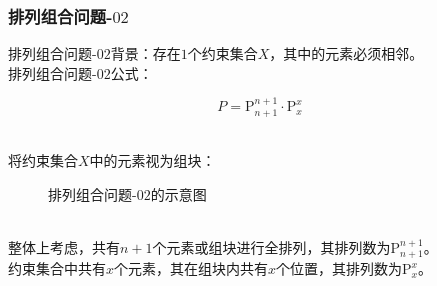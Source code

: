 \documentclass[UTF8]{ctexart}
\newcommand{\rnum}[1]{\uppercase\expandafter{\romannumeral #1\relax}}
\begin{document}
\newpage

\subsubsection{排列组合问题\rnum{1}-$02$}
    排列组合问题\rnum{1}-$02$背景：存在$1$个约束集合$X$，其中的元素必须相邻。\\[3mm]
    排列组合问题\rnum{1}-$02$公式：
    \begin{large}
        \begin{equation*}
           P=\mathrm{P}_{n+1}^{n+1}\cdot\mathrm{P}_x^x
        \end{equation*}
    \end{large}\\
    将约束集合$X$中的元素视为组块：
    \begin{figure}[h]
        \begin{center}
            \caption{排列组合问题\rnum{1}-$02$的示意图}
        \end{center}
    \end{figure}\\
    整体上考虑，共有$n+1$个元素或组块进行全排列，其排列数为$\mathrm{P}_{n+1}^{n+1}$。\\[3mm]
    约束集合中共有$x$个元素，其在组块内共有$x$个位置，其排列数为$\mathrm{P}_{x}^{x}$。\\
\end{document}
